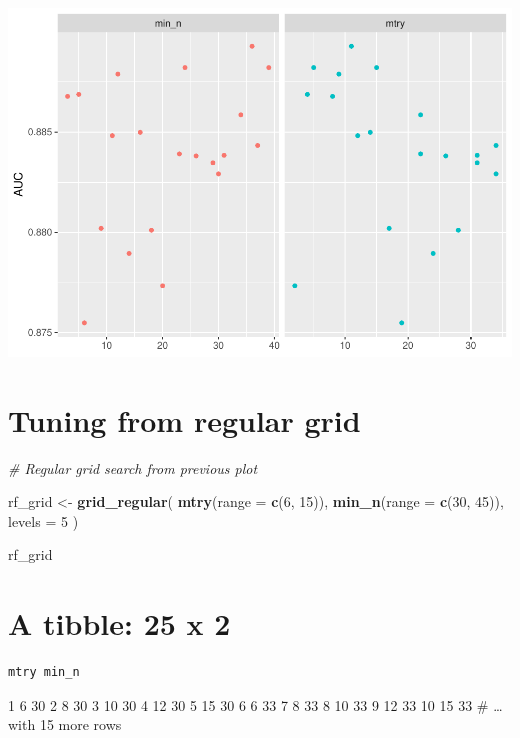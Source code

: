 \documentclass[]{article}
\newenvironment{Shaded}{\begin{snugshade}}{\end{snugshade}}
\newcommand{\CommentTok}[1]{\textcolor[rgb]{0.56,0.35,0.01}{\textit{#1}}}
\newcommand{\DataTypeTok}[1]{\textcolor[rgb]{0.13,0.29,0.53}{#1}}
\newcommand{\DecValTok}[1]{\textcolor[rgb]{0.00,0.00,0.81}{#1}}
\newcommand{\KeywordTok}[1]{\textcolor[rgb]{0.13,0.29,0.53}{\textbf{#1}}}
\newcommand{\NormalTok}[1]{#1}
\newcommand{\StringTok}[1]{\textcolor[rgb]{0.31,0.60,0.02}{#1}}
\begin{document}
\includegraphics{model_spec_files/figure-latex/unnamed-chunk-11-1.pdf}

\hypertarget{tuning-from-regular-grid}{%
\section{Tuning from regular grid}\label{tuning-from-regular-grid}}

\begin{Shaded}
\begin{Highlighting}[]
\CommentTok{# Regular grid search from previous plot}

\NormalTok{rf_grid <-}\StringTok{ }\KeywordTok{grid_regular}\NormalTok{(}
  \KeywordTok{mtry}\NormalTok{(}\DataTypeTok{range =} \KeywordTok{c}\NormalTok{(}\DecValTok{6}\NormalTok{, }\DecValTok{15}\NormalTok{)),}
  \KeywordTok{min_n}\NormalTok{(}\DataTypeTok{range =} \KeywordTok{c}\NormalTok{(}\DecValTok{30}\NormalTok{, }\DecValTok{45}\NormalTok{)),}
  \DataTypeTok{levels =} \DecValTok{5}
\NormalTok{)}

\NormalTok{rf_grid}
\end{Highlighting}
\end{Shaded}

\hypertarget{a-tibble-25-x-2}{%
\section{A tibble: 25 x 2}\label{a-tibble-25-x-2}}

\begin{verbatim}
mtry min_n
\end{verbatim}

1 6 30 2 8 30 3 10 30 4 12 30 5 15 30 6 6 33 7 8 33 8 10 33 9 12 33 10
15 33 \# \ldots{} with 15 more rows
\end{document}
